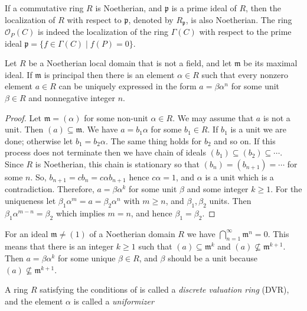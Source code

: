 \begin{remark}
If a commutative ring $R$ is Noetherian, and $\mathfrak{p}$ is a prime ideal of $R$, then the 
localization of $R$ with respect to $\mathfrak{p}$, denoted by $R_{\mathfrak{p}}$, is also 
Noetherian. The ring $\mathcal{O}_P(C)$ is indeed the localization of the ring $\Gamma(C)$ with 
respect to the prime ideal $\mathfrak{p} = \{ f \in \Gamma(C) \mid f(P) = 0 \}$.
\end{remark}
\begin{proposition}
\label{proposition:dvr}
Let $R$ be a Noetherian local domain that is not a field, and let $\mathfrak{m}$ be its maximal 
ideal. If $\mathfrak{m}$ is principal then there is an element $\alpha \in R$ such that every 
nonzero element $a \in R$ can be uniquely expressed in the form $a = \beta \alpha^n$ for some unit 
$\beta \in R$ and nonnegative integer $n$.
\end{proposition}
\begin{proof}
Let $\mathfrak{m} = (\alpha)$ for some non-unit $\alpha \in R$. We may assume that $a$ is not a 
unit. Then $(a) \subseteq \mathfrak{m}$. We have $a = b_1\alpha$ for some $b_1 \in R$. If $b_1$ is a 
unit we are done; otherwise let $b_1 = b_2\alpha$. The same thing holds for $b_2$ and so on. If this 
process does not terminate then we have chain of ideals $(b_1) \subseteq (b_2) \subseteq \cdots$. 
Since $R$ is Noetherian, this chain is stationary so that $(b_n) = (b_{n + 1}) = \cdots$ for some 
$n$. So, $b_{n + 1} = cb_n = c\alpha b_{n + 1}$ hence $c\alpha = 1$, and $\alpha$ is a unit which is 
a contradiction. Therefore, $a = \beta\alpha^k$ for some unit $\beta$ and some integer $k \ge 1$. 
For the uniqueness let  $\beta_1\alpha^m = a = \beta_2\alpha^n$ with $m \ge n$, and $\beta_1, 
\beta_2$ units. Then $\beta_1\alpha^{m - n} = \beta_2$ which implies $m = n$, and hence $\beta_1 = 
\beta_2$.
\end{proof}
\begin{remark}
For an ideal $\mathfrak{m} \ne (1)$ of a Noetherian domain $R$ we have $\bigcap_{n = 1}^\infty 
\mathfrak{m}^n = 0$. This means that there is an integer $k \ge 1$ such that $(a) \subseteq 
\mathfrak{m}^k$ and $(a) \nsubseteq \mathfrak{m}^{k + 1}$. Then $a = \beta \alpha^k$ for some unique 
$\beta \in R$, and $\beta$ should be a unit because $(a) \nsubseteq \mathfrak{m}^{k + 1}$. 
\end{remark}
A ring $R$ satisfying the conditions of  is called a 
\textit{discrete valuation ring} (DVR), and the element $\alpha$ is called a \textit{uniformizer} 
